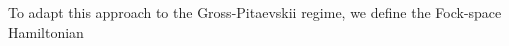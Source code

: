 \documentclass[11pt,a4paper]{article}
\newcommand{\cU}{{\cal U}}
\newcommand{\cH}{{\cal H}}
\newcommand{\cL}{{\cal L}}
\begin{document}
%
To adapt this approach to the Gross-Pitaevskii regime, we define the Fock-space Hamiltonian
\end{document}

